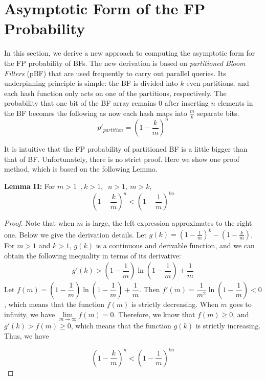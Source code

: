 \presec \section{Asymptotic Form of the FP Probability} \postsec \label{sec:limitf}
%
In this section, we derive a new approach to computing the asymptotic form for the FP probability of BFs. 
%
The new derivation is based on \textit{partitioned Bloom Filters} (pBF) that are used frequently to carry out parallel queries. 
%
Its underpinning principle is simple: the BF is divided into $k$ even partitions, and each hash function only acts on one of the partitions, respectively.
%
The probability that one bit of the BF array remains 0 after inserting $n$ elements in the BF becomes the following as now each hash maps into $\frac{m}{k}$ separate bits.
%
\begin{equation}
p'_{partition} = \left( 1-\dfrac{k}{m} \right)^n
\label{equ:p'pBF}
\end{equation}

It is intuitive that the FP probability of partitioned BF is a little bigger than that of BF. 
%
Unfortunately, there is no strict proof. 
%
Here we show one proof method, which is based on the following Lemma. 

\vspace{0.05in}
\noindent\textbf{Lemma II:} For $m > 1 \;\;,   k >1, \;\; n > 1, \: m>k$,
\begin{equation}
\label{theorem1}
\left( 1-\dfrac{k}{m} \right)  ^n <
\left( 1-\dfrac{1}{m} \right)  ^{kn}
\end{equation}

\begin{proof}
Note that when $m$ is large, the left expression approximates to the right one. Below we give the derivation details.
%
Let $g(k)=( 1-\frac{1}{m} )  ^k- ( 1-\frac{k}{m} )$. 
%
For $m>1$ and $k>1$, $g(k)$ is a continuous and derivable function, and we can obtain the following inequality in terms of its derivative:
%
\begin{equation}
\begin{aligned}
g'(k) %
> \left( 1- \dfrac{1}{m}\right)\ln\left(1-\dfrac{1}{m}\right)+\dfrac{1}{m}
\end{aligned}
\end{equation}
%
Let $f(m)=\left( 1- \dfrac{1}{m}\right)\ln\left(1-\dfrac{1}{m}\right)+\dfrac{1}{m}$.
%
Then $f'(m) = \dfrac{1}{m^2} \ln\left(1-\dfrac{1}{m}\right)< 0$, which means that the function $f(m)$ is strictly decreasing.
%
When $m$ goes to infinity, we have $\lim\limits_{m \to \infty}  f(m) =  0$. 
%
Therefore, we know that $f(m) \geqslant 0$, and $g'(k) > f(m) \geqslant 0$, which means that the function $g(k)$ is strictly increasing.
%
Thus, we have
%

\begin{equation}
\left( 1-\dfrac{k}{m} \right) ^n   <
\left( 1-\dfrac{1}{m} \right)  ^{kn}
\end{equation}
\end{proof}

